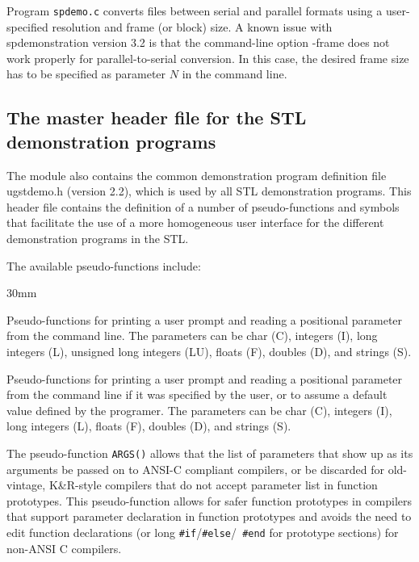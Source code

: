 Program {\tt spdemo.c} converts files between serial and parallel
formats using a user-specified resolution and frame (or block) size. A
known issue with spdemonstration version 3.2 is that the command-line option
-frame does not work properly for parallel-to-serial conversion. In
this case, the desired frame size has to be specified as parameter $N$
in the command line.

\subsection {The master header file for the STL demonstration programs}

The module also contains the common demonstration program definition file
ugstdemo.h (version 2.2), which is used by all STL demonstration programs. This
header file contains the definition of a number of pseudo-functions
and symbols that facilitate the use of a more homogeneous user
interface for the different demonstration programs in the STL.

The available pseudo-functions include:
\begin{Descr}{30mm}
 \item[{\tt GET\_PAR\_*}]
        Pseudo-functions for printing a user prompt and reading a
        positional parameter from the command line. The parameters can
        be char (C), integers (I), long integers (L), unsigned long
        integers (LU), floats (F), doubles (D), and strings (S).

\item[{\tt FIND\_PAR\_*}]
        Pseudo-functions for printing a user prompt and reading a
        positional parameter from the command line if it was specified
        by the user, or to assume a default value defined by the
        programer. The parameters can be char (C), integers (I), long
        integers (L), floats (F), doubles (D), and strings (S).

 \item[{\tt ARGS()}]
        The pseudo-function {\tt ARGS()} allows that the list of
        parameters that show up as its arguments be passed on to
        ANSI-C compliant compilers, or be discarded for
        old-vintage, K\&R-style compilers that do not accept parameter
        list in function prototypes. This pseudo-function allows for
        safer function prototypes in compilers that support parameter
        declaration in function prototypes and avoids the need to edit
        function declarations (or long {\tt \#if}/{\tt \#else}/{\tt
        \#end} for prototype sections) for non-ANSI C compilers.
\end{Descr}


